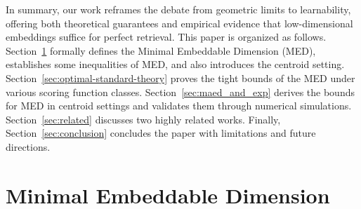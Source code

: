 \documentclass[10pt]{article}
\begin{document}
In summary, our work reframes the debate from geometric limits to learnability, offering both theoretical guarantees and empirical evidence that low-dimensional embeddings suffice for perfect retrieval.
This paper is organized as follows. Section~\ref{sec:problem-definition} formally defines the Minimal Embeddable Dimension (MED), establishes some inequalities of MED, and also introduces the centroid setting. Section~\ref{sec:optimal-standard-theory} proves the tight bounds of the MED under various scoring function classes. Section~\ref{sec:maed_and_exp} derives the bounds for MED in centroid settings and validates them through numerical simulations. Section~\ref{sec:related} discusses two highly related works. Finally, Section~\ref{sec:conclusion} concludes the paper with limitations and future directions.

\section{Minimal Embeddable Dimension}\label{sec:problem-definition}
\end{document}
